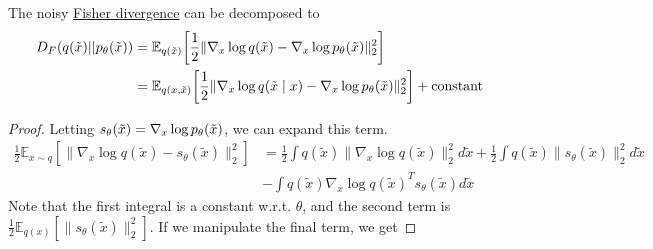 \documentclass{article}
\begin{document}
    \begin{theorem}
      \label{thm:decomposition-of-noisy-fisher-divergence}
      The noisy \hyperref[def:fisher-divergence]{Fisher divergence} can be decomposed to
      \begin{align}
        D_F (q(\Tilde{x}) || p_\theta(\Tilde{x})) & = \mathbb{E}_{q(\Tilde{x})} \bigg[ \frac{1}{2} \| \nabla_x \log q(\Tilde{x}) - \nabla_x \log p_\theta (\Tilde{x})\|_2^2 \bigg] \\
                                                  & = \mathbb{E}_{q(x, \Tilde{x})} \bigg[ \frac{1}{2} \| \nabla_x \log q(\Tilde{x} \mid x) - \nabla_x \log p_\theta (\Tilde{x})\|_2^2 \bigg] + \mathrm{constant}
      \end{align}
    \end{theorem}
    \begin{proof}
      Letting $s_\theta (\Tilde{x}) = \nabla_x \log p_\theta (\Tilde{x})$, we can expand this term. 
      \begin{align}
        \frac{1}{2} \mathbb{E}_{x\sim q}\left[\|\nabla_x \log q(\tilde{x}) - s_\theta(\tilde{x})\|_2^2\right] & = \frac{1}{2}\int q(\tilde{x})\|\nabla_x \log q(\tilde{x})\|_2^2 d\tilde{x} + \frac{1}{2}\int q(\tilde{x})\|s_\theta(\tilde{x})\|_2^2 d\tilde{x} \\ 
                                                                                                     & - \int q(\tilde{x})\nabla_x \log q(\tilde{x})^T s_\theta(\tilde{x}) d\tilde{x}
      \end{align}
      Note that the first integral is a constant w.r.t. $\theta$, and the second term is $\frac{1}{2} \mathbb{E}_{q(x)} [\|s_\theta (\tilde{x})\|_2^2]$. If we manipulate the final term, we get 


\end{proof}
\end{document}
